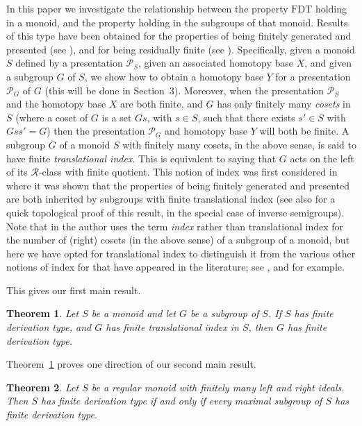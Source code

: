 \documentclass[11pt]{amsart}
\newtheorem{thm}{Theorem}
\theoremstyle{plain}
\begin{document}
In this paper we investigate the relationship between the property $\mathrm{FDT}$ holding in a monoid, and the property holding in the subgroups of that monoid. Results of this type have been obtained for 
the properties of being finitely generated and presented (see \cite{Ruskuc2}), and for being residually finite (see \cite{Golubov1}). Specifically, given a monoid $S$ defined by a presentation $\mathcal{P}_S$, given an associated homotopy base $X$, and given a subgroup $G$ of $S$, we show how to obtain a homotopy base $Y$ for a presentation $\mathcal{P}_G$ of $G$ (this will be done in Section~3). Moreover, when the presentation $\mathcal{P}_S$ and the homotopy base $X$ are both finite, and $G$ has only finitely many \emph{cosets} in $S$ (where a coset of $G$ is a set $Gs$, with $s \in S$, such that there exists $s' \in S$ with $Gss'=G$) then the presentation $\mathcal{P}_G$ and homotopy base $Y$ will both be finite. A subgroup $G$ of a monoid $S$ with finitely many cosets, in the above sense, is said to have finite \emph{translational index}. This is equivalent to saying that $G$ acts on the left of its ${\mathcal{R}}$-class with finite quotient. This notion of index was first considered in \cite{Ruskuc2} where it was shown that the properties of being finitely generated and presented are both inherited by subgroups with finite translational index (see also \cite{Steinberg1} for a quick topological proof of this result, in the special case of inverse semigroups). Note that in \cite{Ruskuc2} the author uses the term \emph{index} rather than translational index for the number of (right) cosets (in the above sense) of a subgroup of a monoid, but here we have opted for translational index to distinguish it from the various other notions of index for that have appeared in the literature; see \cite{Bergman}, \cite{Ruskuc&Thomas} and \cite{Gray1} for example. 

This gives our first main result.  

\begin{thm}\label{bigtosmall}
Let $S$ be a monoid and let $G$ be a subgroup of $S$. If $S$ has finite derivation type,
and $G$ has finite translational index in $S$, then $G$ has finite derivation type.
\end{thm}

Theorem~\ref{bigtosmall} proves one direction of our second main result.

\begin{thm}\label{main_0}
Let $S$ be a regular monoid with finitely many left and right ideals. Then $S$ has finite derivation type if and only if every maximal subgroup of $S$ has finite derivation type.
\end{thm}
\end{document}
